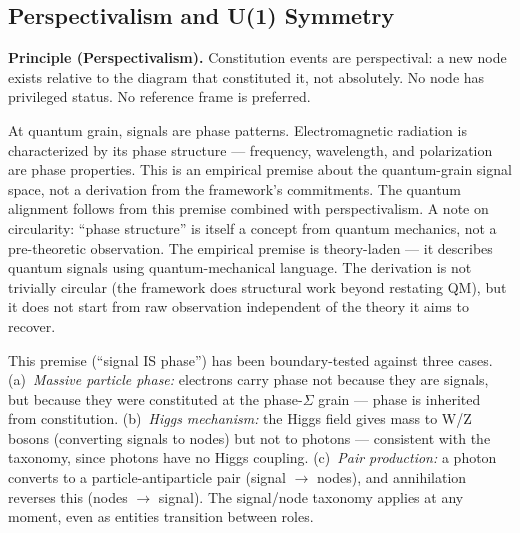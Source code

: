 \documentclass[12pt,a4paper]{article}
\begin{document}
\subsection{Perspectivalism and U(1) Symmetry}
\label{sec:u1-symmetry}

\textbf{Principle (Perspectivalism).} Constitution events are perspectival: a new node exists relative to the diagram that constituted it, not absolutely. No node has privileged status. No reference frame is preferred.

At quantum grain, signals are phase patterns. Electromagnetic radiation is characterized by its phase structure --- frequency, wavelength, and polarization are phase properties. This is an empirical premise about the quantum-grain signal space, not a derivation from the framework's commitments. The quantum alignment follows from this premise combined with perspectivalism. A note on circularity: ``phase structure'' is itself a concept from quantum mechanics, not a pre-theoretic observation. The empirical premise is theory-laden --- it describes quantum signals using quantum-mechanical language. The derivation is not trivially circular (the framework does structural work beyond restating QM), but it does not start from raw observation independent of the theory it aims to recover.

This premise (``signal IS phase'') has been boundary-tested against three cases. (a)~\emph{Massive particle phase:} electrons carry phase not because they are signals, but because they were constituted at the phase-$\Sigma$ grain --- phase is inherited from constitution. (b)~\emph{Higgs mechanism:} the Higgs field gives mass to W/Z bosons (converting signals to nodes) but not to photons --- consistent with the taxonomy, since photons have no Higgs coupling. (c)~\emph{Pair production:} a photon converts to a particle-antiparticle pair (signal $\to$ nodes), and annihilation reverses this (nodes $\to$ signal). The signal/node taxonomy applies at any moment, even as entities transition between roles.
\end{document}
